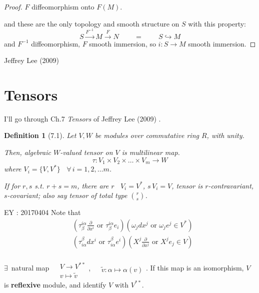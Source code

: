 \documentclass[10pt]{amsart}
\newtheorem{definition}{Definition}
\begin{document}
\begin{multicols*}{2}
\begin{proof}
$F$ diffeomorphism onto $F(M)$.  

	and these are the only topology and smooth structure on $S$ with this property: 
	\[
	S \xrightarrow{F^{-1}} M \xrightarrow{F} N \qquad \, = \qquad \, S \hookrightarrow M
	\]
	and $F^{-1}$ diffeomorphism, $F$ smooth immersion, so $i : S \to M$ smooth immersion.  
	\end{proof}

	




Jeffrey Lee (2009) \cite{JLee2009}





\section{Tensors}

I'll go through Ch.7 \emph{Tensors} of Jeffrey Lee (2009) \cite{JLee2009}.  

\begin{definition}[7.1\cite{JLee2009}] Let $V,W$ be modules over commutative ring $R$, with unity.  

Then, algebraic $W$-valued tensor on $V$ is multilinear map.  
\begin{equation}
	\tau: V_1 \times V_2 \times \dots \times V_m \to W
\end{equation}
where $V_i = \lbrace V,V^* \rbrace$ \quad \, $ \forall \, i=1,2,\dots m$.  

If for $r,s$ s.t. $r+s =m$, there are $r$ \, $V_i = V^*$, $s \, V_i = V$, tensor is $r$-contravariant, $s$-covariant; also say tensor of total type $\binom{r}{s}$.  
\end{definition}

EY : 20170404 Note that 
\[
\begin{aligned}
	& ( \tau_{\beta}^{i\alpha} \frac{ \partial }{ \partial x^i } \text{ or } \tau_{\beta}^{i\alpha} e_i )(\omega_j dx^j \text{ or } \omega_je^j  \in V^*) \\ 
	& ( \tau^{\beta}_{i\alpha} dx^i \text{ or } \tau^{\beta}_{i\alpha} e^i )( X^j \frac{ \partial }{ \partial x^j} \text{ or } X^j e_j  \in V) 
\end{aligned}
\]

$\exists \,$ natural map $\begin{aligned} & \quad \\ 
	& V\to V^{**} \\ 
& v \mapsto \widetilde{v} \end{aligned}$,  $\begin{aligned} & \quad \\ 
	& \widetilde{v} : \alpha \mapsto \alpha(v) \end{aligned}$.  If this map is an isomorphism, $V$ is \textbf{reflexive} module, and identify $V$ with $V^{**}$.  


\end{multicols*}
\end{document}
